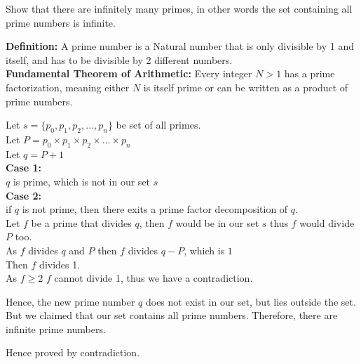\documentclass[addpoints]{exam}
\newenvironment{problem}[2][Problem]{\begin{trivlist}
    \item[\hskip \labelsep {\bfseries #1}\hskip \labelsep {\bfseries #2.}]}{\end{trivlist}}
\begin{document}
\begin{sloppypar}
    \begin{problem}{14}
    Show that there are infinitely many primes, in other words the set containing all prime numbers is infinite.
    \end{problem}

    \begin{questions}
        \question
        \begin{solution}
            
            \textbf{Definition:} A prime number is a Natural number that is only divisible by 1 and itself, and has to be divisible by 2 different numbers.
            \\\textbf{Fundamental Theorem of Arithmetic:} Every integer $N > 1$ has a prime factorization, meaning either $N$ is itself prime or can be written as a product of prime numbers.

            Let $s=\{p_0,p_1,p_2,...,p_n\}$ be set of all primes. 
            \\Let $P = p_0 \times p_1 \times p_2 \times ... \times p_n$
            \\Let $q = P+1$
            \\\textbf{Case 1:}
            \\$q$ is prime, which is not in our set $s$
            \\\textbf{Case 2:} 
            \\if $q$ is not prime, then there exits a prime factor decomposition of $q$.
            \\Let $f$ be a prime that divides $q$, then $f$ would be in our set $s$ thus $f$ would divide $P$ too. 
            \\As $f$ divides $q$ and $P$ then $f$ divides $q-P$, which is $1$
            \\Then $f$ divides 1.
            \\As $f\geq2$ $f$ cannot divide 1, thus we have a contradiction.

            Hence, the new prime number $q$ does not exist in our set, but lies outside the set. But we claimed that our set contains all prime numbers. Therefore, there are infinite prime numbers.
            
            Hence proved by contradiction.
        \end{solution}
    \end{questions}

\end{sloppypar}
\end{document}
